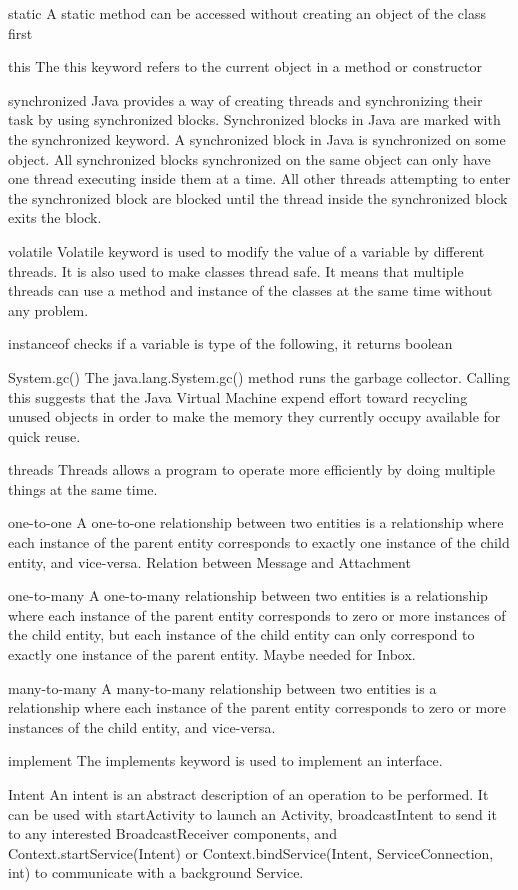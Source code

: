 \documentclass[a4paper,12pt]{article}
\begin{document}
static
A static method can be accessed without creating an object of the class first

this
The this keyword refers to the current object in a method or constructor

synchronized
Java provides a way of creating threads and synchronizing their task by using synchronized blocks. Synchronized blocks in Java are marked with the synchronized keyword. 
A synchronized block in Java is synchronized on some object. 
All synchronized blocks synchronized on the same object can only have one thread executing inside them at a time.
All other threads attempting to enter the synchronized block are blocked until the thread inside the synchronized block exits the block.

volatile
Volatile keyword is used to modify the value of a variable by different threads. It is also used to make classes thread safe. 
It means that multiple threads can use a method and instance of the classes at the same time without any problem.

instanceof
checks if a variable is type of the following, it returns boolean

System.gc()
The java.lang.System.gc() method runs the garbage collector. 
Calling this suggests that the Java Virtual Machine expend effort 
toward recycling unused objects in order to make the memory they currently occupy available for quick reuse.

threads
Threads allows a program to operate more efficiently by doing multiple things at the same time.

one-to-one 
A one-to-one relationship between two entities is a relationship where each instance of the parent entity corresponds to exactly one instance of the child entity, and vice-versa.
Relation between Message and Attachment


one-to-many
A one-to-many relationship between two entities is a relationship where each instance of the parent entity corresponds to zero or more instances of the child entity, 
but each instance of the child entity can only correspond to exactly one instance of the parent entity.
Maybe needed for Inbox. 


many-to-many
A many-to-many relationship between two entities is a relationship where each instance of the parent entity corresponds to zero or more instances of the child entity, and vice-versa.

implement
The implements keyword is used to implement an interface.

Intent
An intent is an abstract description of an operation to be performed. It can be used with startActivity to launch an Activity, broadcastIntent to send it to any interested BroadcastReceiver components, and Context.startService(Intent) or Context.bindService(Intent, ServiceConnection, int) to communicate with a background Service.
\end{document}
